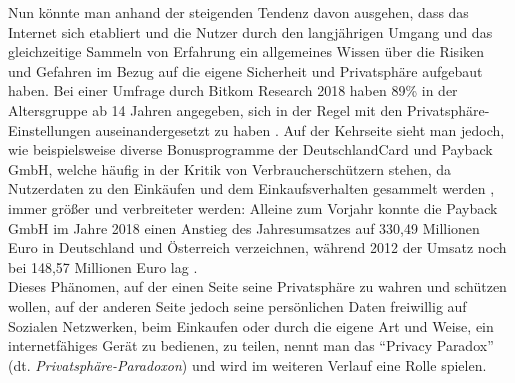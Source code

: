 Nun könnte man anhand der steigenden Tendenz davon ausgehen, dass das Internet sich etabliert und die Nutzer durch den langjährigen Umgang und das gleichzeitige Sammeln von Erfahrung ein allgemeines Wissen über die Risiken und Gefahren im Bezug auf die eigene Sicherheit und Privatsphäre aufgebaut haben. Bei einer Umfrage durch 
Bitkom Research 2018 haben 89\% in der Altersgruppe ab 14 Jahren angegeben, sich in der Regel mit den Privatsphäre-Einstellungen auseinandergesetzt zu haben \cite{Bitkom:2018aa}. Auf der Kehrseite sieht man jedoch, wie beispielsweise diverse Bonusprogramme der DeutschlandCard und Payback GmbH, welche häufig in der Kritik von 
Verbraucherschützern stehen, da Nutzerdaten zu den Einkäufen und dem Einkaufsverhalten gesammelt werden \cite{Hatke:aa}, immer größer und verbreiteter werden: Alleine zum Vorjahr konnte die Payback GmbH im Jahre 2018 einen Anstieg des Jahresumsatzes auf 330,49 Millionen Euro in Deutschland und Österreich verzeichnen, während 2012 der Umsatz noch bei 148,57 Millionen 
Euro lag \cite{Payback:2019aa}. \\ Dieses Phänomen, auf der einen Seite seine Privatsphäre zu wahren und schützen wollen, auf der anderen Seite jedoch seine persönlichen Daten freiwillig auf Sozialen Netzwerken, beim Einkaufen oder durch die eigene Art und Weise, ein internetfähiges Gerät zu bedienen, zu teilen, nennt man das \enquote{Privacy Paradox} (dt. 
\textit{Privatsphäre-Paradoxon}) \cite{Barnes:2006aa} und wird im weiteren Verlauf eine Rolle spielen.